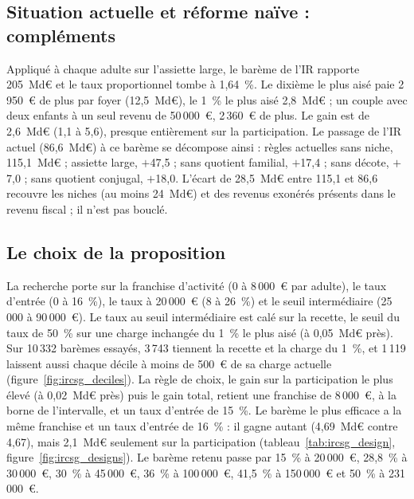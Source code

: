 \subsection{Situation actuelle et réforme naïve : compléments}




Appliqué à chaque adulte sur l'assiette large, le barème de l'IR rapporte 205~Md€ et le taux proportionnel tombe à
1,64~\%. Le dixième le plus aisé paie 2\,950~€ de plus par foyer (12,5~Md€), le 1~\% le plus aisé 2,8~Md€ ; un couple
avec deux enfants à un seul revenu de 50\,000~€, 2\,360~€ de plus. Le gain est de 2,6~Md€ (1,1 à 5,6), presque
entièrement sur la participation. Le passage de l'IR actuel (86,6~Md€) à ce barème se décompose ainsi : règles actuelles
sans niche, 115,1~Md€ ; assiette large, $+$47,5 ; sans quotient familial, $+$17,4 ; sans décote, $+$7,0 ; sans quotient
conjugal, $+$18,0. L'écart de 28,5~Md€ entre 115,1 et 86,6 recouvre les niches (au moins 24~Md€) et des revenus exonérés
présents dans le revenu fiscal ; il n'est pas bouclé.

\subsection{Le choix de la proposition}

La recherche porte sur la franchise d'activité (0 à 8\,000~€ par adulte), le taux d'entrée (0 à 16~\%), le taux à
20\,000~€ (8 à 26~\%) et le seuil intermédiaire (25\,000 à 90\,000~€). Le taux au seuil intermédiaire est calé sur la
recette, le seuil du taux de 50~\% sur une charge inchangée du 1~\% le plus aisé (à 0,05~Md€ près). Sur 10\,332 barèmes
essayés, 3\,743 tiennent la recette et la charge du 1~\%, et 1\,119 laissent aussi chaque décile à moins de 500~€ de sa
charge actuelle (figure~\ref{fig:ircsg_deciles}). La règle de choix, le gain sur la participation le plus élevé (à
0,02~Md€ près) puis le gain total, retient une franchise de 8\,000~€, à la borne de l'intervalle, et un taux d'entrée de
15~\%. Le barème le plus efficace a la même franchise et un taux d'entrée de 16~\% : il gagne autant (4,69~Md€ contre
4,67), mais 2,1~Md€ seulement sur la participation (tableau~\ref{tab:ircsg_design}, figure~\ref{fig:ircsg_designs}). Le
barème retenu passe par 15~\% à 20\,000~€, 28,8~\% à 30\,000~€, 30~\% à 45\,000~€, 36~\% à 100\,000~€, 41,5~\% à
150\,000~€ et 50~\% à 231\,000~€.

